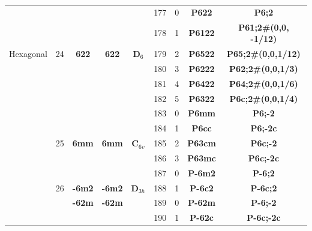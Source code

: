 \documentclass{article}      %
\begin{document}
\begin{small}
\begin{longtable}[c]{|c|c|c|c|c|c|c|c|c|}
          & & & & &\textrm{177} &\textrm{0} &\textbf{P622}         &\textbf{P6;2}\\\cline{6-9}         
          & & & & &\textrm{178} &\textrm{1} &\textbf{P6122}       &\textbf{P61;2#(0,0, -1/12)}\\\cline{6-9}
 \textrm{Hexagonal} & \textrm{24} &\textbf{622} &\textbf{622} &$\mathbf{D}_6$ &\textrm{179} &\textrm{2} &\textbf{P6522}       &\textbf{P65;2#(0,0,1/12)}\\\cline{6-9} 
          & & & & &\textrm{180} &\textrm{3} &\textbf{P6222}       &\textbf{P62;2#(0,0,1/3)}\\\cline{6-9}  
          & & & & &\textrm{181} &\textrm{4} &\textbf{P6422}       &\textbf{P64;2#(0,0,1/6)}\\\cline{6-9}  
          & & & & &\textrm{182} &\textrm{5} &\textbf{P6322}       &\textbf{P6c;2#(0,0,1/4)}\\\cline{2-9}  
          & & & & &\textrm{183}  &\textrm{0} &\textbf{P6mm}         &\textbf{P6;-2}\\\cline{6-9}        
          & & & & &\textrm{184}  &\textrm{1} &\textbf{P6cc}         &\textbf{P6;-2c}\\\cline{6-9}       
 & \textrm{25} &\textbf{6mm} &\textbf{6mm} &$\mathbf{C}_{6v}$  &\textrm{185}  &\textrm{2} &\textbf{P63cm}       &\textbf{P6c;-2}\\\cline{6-9}        
          & & & & &\textrm{186}  &\textrm{3} &\textbf{P63mc}       &\textbf{P6c;-2c}\\\cline{2-9}       
          & & & & &\textrm{187}  &\textrm{0} &\textbf{P-6m2}       &\textbf{P-6;2}\\\cline{6-9}         
	  &\textrm{26}  &\textbf{-6m2}  &\textbf{-6m2} &$\mathbf{D}_{3h}$ &\textrm{188}  &\textrm{1} &\textbf{P-6c2} &\textbf{P-6c;2}\\\cline{3-4}\cline{6-9} 
          & &\textbf{-62m} &\textbf{-62m} & &\textrm{189}  &\textrm{0} &\textbf{P-62m}       &\textbf{P-6;-2}\\\cline{6-9}        
          & & & & &\textrm{190}  &\textrm{1} &\textbf{P-62c}       &\textbf{P-6c;-2c}\\\cline{2-9}      

\end{longtable}
\end{small}
\end{document}

